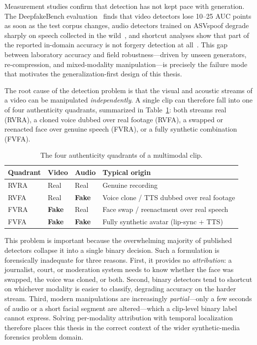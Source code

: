 Measurement studies confirm that detection has not kept pace with
generation. The DeepfakeBench evaluation~\cite{yan2023deepfakebench} finds
that video detectors lose 10--25 AUC points as soon as the test corpus
changes, audio detectors trained on ASVspoof degrade sharply on speech
collected in the wild~\cite{muller2022inthewild}, and shortcut analyses show
that part of the reported in-domain accuracy is not forgery detection at
all~\cite{smeu2025shortcuts}. This gap between
laboratory accuracy and field robustness---driven by unseen generators,
re-compression, and mixed-modality manipulation---is precisely the failure
mode that motivates the generalization-first design of this thesis.

The root cause of the detection problem is that the visual and acoustic streams
of a video can be manipulated \emph{independently}. A single clip can therefore
fall into one of four authenticity quadrants, summarized in
Table~\ref{tab:quadrants}: both streams real (RVRA), a cloned voice dubbed over
real footage (RVFA), a swapped or reenacted face over genuine speech (FVRA), or
a fully synthetic combination (FVFA).

\begin{table}[htbp]
\centering
\caption{The four authenticity quadrants of a multimodal clip.}
\label{tab:quadrants}
\begin{tabular}{llll}
\toprule
\textbf{Quadrant} & \textbf{Video} & \textbf{Audio} & \textbf{Typical origin} \\
\midrule
RVRA & Real & Real & Genuine recording \\
RVFA & Real & \textbf{Fake} & Voice clone / TTS dubbed over real footage \\
FVRA & \textbf{Fake} & Real & Face swap / reenactment over real speech \\
FVFA & \textbf{Fake} & \textbf{Fake} & Fully synthetic avatar (lip-sync + TTS) \\
\bottomrule
\end{tabular}
\end{table}

This problem is important because the overwhelming majority of published
detectors collapse it into a single binary decision. Such a formulation is
forensically inadequate for three reasons. First, it provides no
\emph{attribution}: a journalist, court, or moderation system needs to know
whether the face was swapped, the voice was cloned, or both. Second, binary
detectors tend to shortcut on whichever modality is easier to classify,
degrading accuracy on the harder stream. Third, modern manipulations are
increasingly \emph{partial}---only a few seconds of audio or a short facial
segment are altered---which a clip-level binary label cannot express. Solving
per-modality attribution with temporal localization therefore places this
thesis in the correct context of the wider synthetic-media forensics problem
domain.

